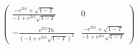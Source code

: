 $\left(
\begin{array}{cc}
 \frac{-e^{2 i x}+\sqrt{1-T}}{-1+e^{2 i x} \sqrt{1-T}} & 0 \\
 -\frac{e^{2 i x} T \kappa }{\left(-1+e^{2 i x} \sqrt{1-T}\right)^2} & \frac{-e^{2 i x}+\sqrt{1-T}}{-1+e^{2 i x} \sqrt{1-T}}
\end{array}
\right)$
